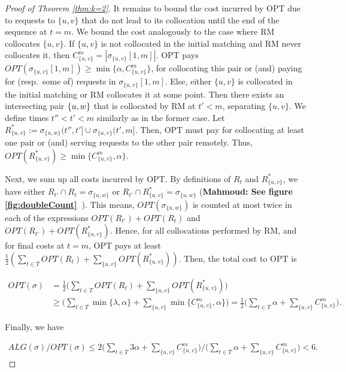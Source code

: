 \documentclass[manuscript,screen=true, review, anonymous]{acmart}
\newcommand{\OPT}{\textsf{OPT}\xspace}
\newcommand{\OPTM}{\mathit{OPT}}
\newcommand{\RM}{\textsf{RM}\xspace} %
\DeclarePairedDelimiter\set{\{}{\}}
\newcommand\mahmoud[1]{\color{orange}\textbf{Mahmoud: #1~}\color{black}}
\begin{document}
\begin{proof}[Proof of Theorem \ref{thm:k=2}]
	It remains to bound the cost  incurred by \OPT due to requests to $\{u,v\}$ that do not lead to its collocation until the end of the sequence at $t=m$.
	We bound the cost analogously to the case where \RM collocates $\{u,v\}$.
	If $\{u,v\}$ is not collocated in the initial matching
	and \RM never collocates it,
	then $ C^{m}_{ \{u,v\} } =| \sigma_{\{u,v\}}[1,m] |$.
	\OPT pays
	$\mathit{OPT} (\sigma_{\{u,v\}}[1,m]) 
	\geq \min{ \{ \alpha, C^{m}_{ \{u,v\} } \} }$,
	for collocating this pair or (and) paying for (resp.~some of) requests in $\sigma_{\{u,v\}}[1,m]$.
	Else,
	either $\{u,v\}$ is collocated in the initial matching
	or \RM collocates it at some point.
	Then there exists an intersecting pair $\set{u,w}$
	that is collocated by \RM at $t' < m$,
	separating $\{u,v\}$.
	We define times $t'' < t' < m$ similarly as in the former case.
	Let $R^*_{\{u,v\}} := \sigma_{\{u,w\}} (t'',t'] \cup \sigma_{\{u,v\}} (t',m]$.
	Then,
	\OPT must pay for collocating at least one pair or (and) serving requests 
	to the other pair remotely.
	Thus,
	$\mathit{OPT} (R^*_{\{u,v\}}) 
	\geq  \min{ \{ C^{m}_{ \{u,v\}}, \alpha \}}$.
	
	Next, we sum up all costs incurred by \OPT.
	By definitions of $R_t$ and $R^*_{\{u,v\}}$, we have either
	$R_{t'} \cap R_t = \sigma_{\{u,w\}}$ or
	$R_{t'} \cap R^*_{\{u,v\}} = \sigma_{\{u,w\}}$
	(\mahmoud{See figure \ref{fig:doubleCount}}). 
	This means,
	$\OPTM ( \sigma_{\{u,w\}})$
	is counted at most twice in each of  the expressions
	$\mathit{OPT} (R_{t'}) + \mathit{OPT} (R_t)$
	and  
	$\mathit{OPT} (R_{t'}) + \mathit{OPT} (R^*_{\{u,v\}})$.
	Hence,
	for all collocations performed by \RM,
	and for final costs at $t=m$,
	\OPT pays at least 
	$\frac{1}{2}(
	\sum_{ t \in T } \mathit{OPT} (R_t) +
	\sum_{\{u,v\}} \mathit{OPT} (R^*_{\{u,v\}})
	) $.
	Then,
	the total cost to \OPT is
	
	\begin{align*} 	%
		\mathit{OPT} (\sigma)
		&=
		\frac{1}{2}
		\Big(
		\sum_{ t \in T} \mathit{OPT} (R_t) 
		+ \sum_{\{u,v\}}\mathit{OPT} (R^*_{\{u,v\}})
		\Big)	\\
		&\geq
		\Big(
		\sum_{ t \in T} \min{ \{ \lambda, \alpha \}}  +
		\sum_{\{u,v\}} \min{ \{C^{m}_{\{u,v\}} , \alpha \} } 
		\Big)		
		=
		\frac{1}{2}		
		\Big(
		\sum_{ t \in T} \alpha  
		+ \sum_{\{u,v\}} C^{m}_{\{u,v\}}
		\Big).
	\end{align*}

Finally, we have

\begin{align*}
	\mathit{ALG} (\sigma)	/
	\mathit{OPT} (\sigma)
	\leq
	2\Big(
	\sum_{ t \in T} 3\alpha +
	\sum_{\{u,v\}} C^{m}_{\{u,v\}}
	\Big)	 \big /
	\Big(
	\sum_{ t \in T} \alpha  
	+ \sum_{\{u,v\}} C^{m}_{\{u,v\}}  
	\Big)	< 6.
\end{align*}

\end{proof}
\end{document}
